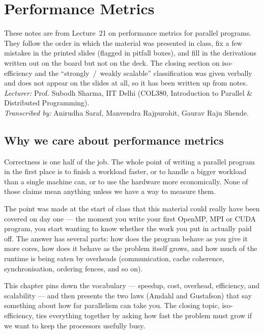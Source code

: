 \chapter{Performance Metrics}

\begin{ppnote}
These notes are from Lecture~21 on performance metrics for parallel programs.
They follow the order in which the material was presented in class, fix a
few mistakes in the printed slides (flagged in pitfall boxes), and fill in the
derivations written out on the board but not on the deck. The closing
section on iso-efficiency and the ``strongly~/~weakly scalable'' classification
was given verbally and does not appear on the slides at all, so it has been
written up from notes.\\[2pt]
\textit{Lecturer:} Prof. Subodh Sharma, IIT Delhi (COL380, Introduction to
Parallel \& Distributed Programming).\\
\textit{Transcribed by:} Anirudha Saraf, Manvendra Rajpurohit, Gaurav Raju Shende.
\end{ppnote}

\section{Why we care about performance metrics}

Correctness is one half of the job. The whole point of writing a parallel
program in the first place is to finish a workload faster, or to handle a
bigger workload than a single machine can, or to use the hardware more
economically. None of those claims mean anything unless we have a way to
measure them.

The point was made at the start of class that this material could really
have been covered on day one --- the moment you write your first OpenMP, MPI
or CUDA program, you start wanting to know whether the work you put in
actually paid off. The answer has several parts: how does the program
behave as you give it more cores, how does it behave as the problem itself
grows, and how much of the runtime is being eaten by overheads
(communication, cache coherence, synchronisation, ordering fences, and so on).

This chapter pins down the vocabulary --- speedup, cost, overhead,
efficiency, and scalability --- and then presents the two laws (Amdahl and
Gustafson) that say something about how far parallelism can take you. The
closing topic, iso-efficiency, ties everything together by asking how fast
the problem must grow if we want to keep the processors usefully busy.

